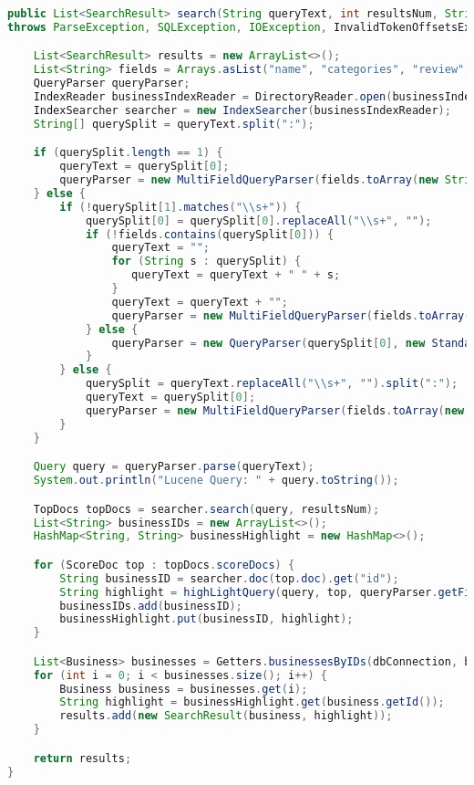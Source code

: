 \begin{lstlisting}[language=Java]
public List<SearchResult> search(String queryText, int resultsNum, String orderBy)
throws ParseException, SQLException, IOException, InvalidTokenOffsetsException {

    List<SearchResult> results = new ArrayList<>();
    List<String> fields = Arrays.asList("name", "categories", "review", "tip");
    QueryParser queryParser;
    IndexReader businessIndexReader = DirectoryReader.open(businessIndex);
    IndexSearcher searcher = new IndexSearcher(businessIndexReader);
    String[] querySplit = queryText.split(":");

    if (querySplit.length == 1) {
        queryText = querySplit[0];
        queryParser = new MultiFieldQueryParser(fields.toArray(new String[fields.size()]), analyzer);
    } else {
        if (!querySplit[1].matches("\\s+")) {
            querySplit[0] = querySplit[0].replaceAll("\\s+", "");
            if (!fields.contains(querySplit[0])) {
                queryText = "";
                for (String s : querySplit) {
                   queryText = queryText + " " + s;
                }
                queryText = queryText + "";
                queryParser = new MultiFieldQueryParser(fields.toArray(new String[fields.size()]), analyzer);
            } else {
                queryParser = new QueryParser(querySplit[0], new StandardAnalyzer(an.getStopWordSet()));
            }
        } else {
            querySplit = queryText.replaceAll("\\s+", "").split(":");
            queryText = querySplit[0];
            queryParser = new MultiFieldQueryParser(fields.toArray(new String[fields.size()]), analyzer);
        }
    }

    Query query = queryParser.parse(queryText);
    System.out.println("Lucene Query: " + query.toString());

    TopDocs topDocs = searcher.search(query, resultsNum);
    List<String> businessIDs = new ArrayList<>();
    HashMap<String, String> businessHighlight = new HashMap<>();

    for (ScoreDoc top : topDocs.scoreDocs) {
        String businessID = searcher.doc(top.doc).get("id");
        String highlight = highLightQuery(query, top, queryParser.getField(), businessIndexReader, searcher);
        businessIDs.add(businessID);
        businessHighlight.put(businessID, highlight);
    }

    List<Business> businesses = Getters.businessesByIDs(dbConnection, businessIDs, orderBy);
    for (int i = 0; i < businesses.size(); i++) {
        Business business = businesses.get(i);
        String highlight = businessHighlight.get(business.getId());
        results.add(new SearchResult(business, highlight));
    }

    return results;
}

\end{lstlisting}

